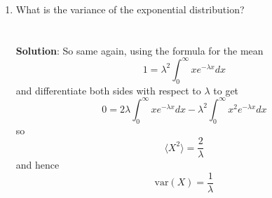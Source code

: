 \documentclass[11pt,a4paper]{scrartcl}
\begin{document}
\begin{enumerate}
\item What is the variance of the exponential distribution?
  \\ \\ \\ \textbf{Solution}: So same again, using the formula for the mean
  \begin{equation}
    1=\lambda^2\int_0^\infty xe^{-\lambda x}dx
  \end{equation}
  and differentiate both sides with respect to $\lambda$ to get
  \begin{equation}
    0=2\lambda\int_0^\infty xe^{-\lambda x}dx-\lambda^2 \int_0^\infty x^2e^{-\lambda x}dx
  \end{equation}
  so
  \begin{equation}
    \langle X^2\rangle=\frac{2}{\lambda}
  \end{equation}
  and hence
  \begin{equation}
    \mbox{var}(X)=\frac{1}{\lambda}
    \end{equation}
\end{enumerate}
\end{document}
